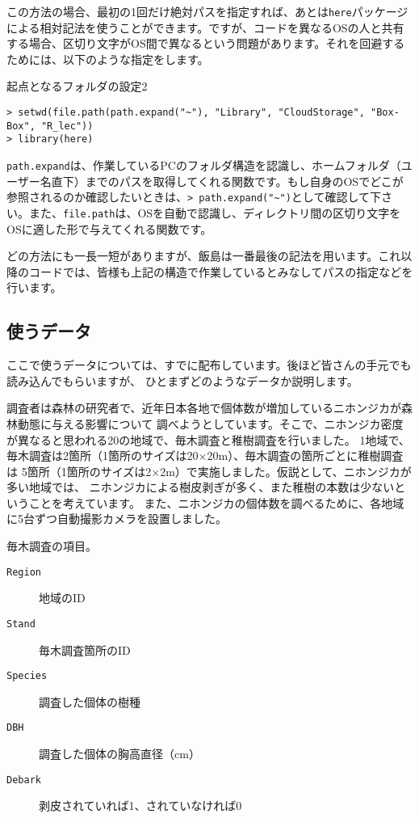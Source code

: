 この方法の場合、最初の1回だけ絶対パスを指定すれば、あとは\texttt{here}パッケージによる相対記法を使うことができます。ですが、コードを異なるOSの人と共有する場合、区切り文字がOS間で異なるという問題があります。それを回避するためには、以下のような指定をします。

\begin{itembox}[l]{起点となるフォルダの設定2}
\begin{verbatim}
> setwd(file.path(path.expand("~"), "Library", "CloudStorage", "Box-Box", "R_lec"))
> library(here)
\end{verbatim}
\end{itembox}
\texttt{path.expand}は、作業しているPCのフォルダ構造を認識し、ホームフォルダ（ユーザー名直下）までのパスを取得してくれる関数です。もし自身のOSでどこが参照されるのか確認したいときは、\verb|> path.expand("~")|として確認して下さい。また、\texttt{file.path}は、OSを自動で認識し、ディレクトリ間の区切り文字をOSに適した形で与えてくれる関数です。

どの方法にも一長一短がありますが、飯島は一番最後の記法を用います。これ以降のコードでは、皆様も上記の構造で作業しているとみなしてパスの指定などを行います。

  \subsection{使うデータ}
ここで使うデータについては、すでに配布しています。後ほど皆さんの手元でも読み込んでもらいますが、
ひとまずどのようなデータか説明します。

調査者は森林の研究者で、近年日本各地で個体数が増加しているニホンジカが森林動態に与える影響について
調べようとしています。そこで、ニホンジカ密度が異なると思われる20の地域で、毎木調査と稚樹調査を行いました。
1地域で、毎木調査は2箇所（1箇所のサイズは20$\times$20m）、毎木調査の箇所ごとに稚樹調査は
5箇所（1箇所のサイズは2$\times$2m）で実施しました。仮説として、ニホンジカが多い地域では、
ニホンジカによる樹皮剥ぎが多く、また稚樹の本数は少ないということを考えています。
また、ニホンジカの個体数を調べるために、各地域に5台ずつ自動撮影カメラを設置しました。

毎木調査の項目。
\begin{description}
  \item[\texttt{Region}]地域のID
  \item[\texttt{Stand}]毎木調査箇所のID
  \item[\texttt{Species}]調査した個体の樹種
  \item[\texttt{DBH}]調査した個体の胸高直径（cm）
  \item[\texttt{Debark}]剥皮されていれば1、されていなければ0
\end{description}

